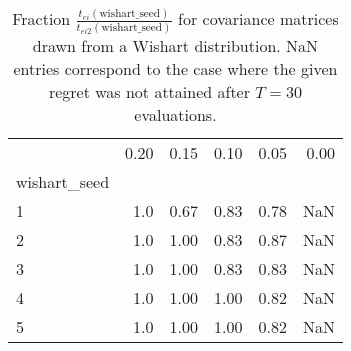 \begin{table}
\centering
\caption{Fraction $\frac{t_{ei}(\text{wishart\_seed})}
    {t_{ei2}(\text{wishart\_seed})}$ for covariance matrices 
    drawn from a Wishart distribution. NaN entries correspond to the 
    case where the given regret was not attained after $T=30$ evaluations.}
\label{fig:wishart_ei_vs_ei2}
\begin{tabular}{lrrrrr}
\toprule
{} &  0.20 &  0.15 &  0.10 &  0.05 &  0.00 \\
wishart\_seed &       &       &       &       &       \\
\midrule
1            &   1.0 &  0.67 &  0.83 &  0.78 &   NaN \\
2            &   1.0 &  1.00 &  0.83 &  0.87 &   NaN \\
3            &   1.0 &  1.00 &  0.83 &  0.83 &   NaN \\
4            &   1.0 &  1.00 &  1.00 &  0.82 &   NaN \\
5            &   1.0 &  1.00 &  1.00 &  0.82 &   NaN \\
\bottomrule
\end{tabular}
\end{table}
